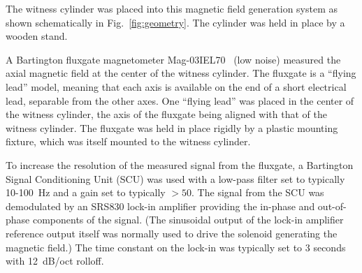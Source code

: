

The witness cylinder was placed into this magnetic field generation
system as shown schematically in Fig.~\ref{fig:geometry}.  The
cylinder was held in place by a wooden stand.

A Bartington fluxgate magnetometer Mag-03IEL70~\cite{bib:bartman} (low noise) measured
the axial magnetic field at the center of the witness cylinder.  The
fluxgate is a ``flying lead'' model, meaning that each axis is
available on the end of a short electrical lead, separable from the
other axes.  One ``flying lead'' was placed in the center of the
witness cylinder, the axis of the fluxgate being aligned with that of
the witness cylinder.  The fluxgate was held in place rigidly by a
plastic mounting fixture, which was itself mounted to the witness
cylinder.


To increase the resolution of the measured signal from the fluxgate, a
Bartington Signal Conditioning Unit (SCU) was used with a low-pass
filter set to typically 10-100~Hz and a gain set to typically $>50$.
The signal from the SCU was demodulated by an SRS830 lock-in amplifier
providing the in-phase and out-of-phase components of the signal.
(The sinusoidal output of the lock-in amplifier reference output
itself was normally used to drive the solenoid generating the magnetic
field.)  The time constant on the lock-in was typically set to 3
seconds with 12~dB/oct rolloff.

